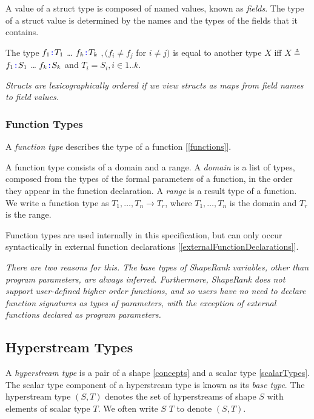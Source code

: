 \documentclass{article}
\begin{document}
A value of a struct type is composed of named values, known as {\em fields}. The type of a struct value is determined by the names and the types of the fields that it contains.

\StructType{}

\PropertySig{}

The type \LCURLY{}$f_1 \texttt{\color{blue} :}{} T_1$\COMMA{} \ldots\COMMA{}  $f_k \texttt{\color{blue} :}{} T_k$\RCURLY{} $, (f_i \ne f_j$ for $i \ne j)$ is equal to another type $X$ iff  $X \triangleq $ \LCURLY{}$f_1 \texttt{\color{blue} :}{} S_1$\COMMA{} \ldots\COMMA{}  $f_k \texttt{\color{blue} :}{} S_k$\RCURLY{} and $T_i = S_i, i \in 1..k$.


{\em
Structs are lexicographically ordered if we view structs as maps from field names to field values. 
}

\subsubsection{Function Types}
\label{functionTypes}

A {\em function type} describes the type of a function [\ref{functions}].

A function type consists of a domain and a range. A {\em domain} is a list of types, composed from the types of the formal parameters of a function, in the order they appear in the function declaration. A {\em range} is a result type of a function. 
We write a  function type as $T_1, \ldots, T_n \to T_r$, where $T_1, \ldots, T_n$ is the domain and $T_r$ is the range.

Function types are used internally in this specification, but can only occur syntactically in external function declarations [\ref{externalFunctionDeclarations}].

{\em 
There are two reasons for this.  The base types of ShapeRank variables, other than program parameters, are always inferred. Furthermore, ShapeRank does not support user-defined higher order functions, and so users have no need to declare function signatures as types of parameters,
with the exception of external functions declared as program parameters.
}


\subsection{Hyperstream Types}
\label{hyperstreamTypes} 

A {\em hyperstream type} is a pair of a shape \ref{concepts} and a scalar type \ref{scalarTypes}. The scalar type component of a hyperstream type is known as its {\em base type}. The hyperstream type $(S,  T)$ denotes the set of hyperstreams of shape $S$ with elements of scalar type $T$. We often write $S$ $T$ to denote $(S,  T)$.
\end{document}
